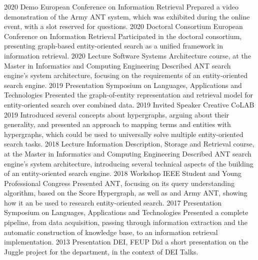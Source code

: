 \documentclass{friggeri-cv}
\begin{document}
\begin{entrylist}
\entry
{2020}
{Demo}
{European Conference on Information Retrieval}
{Prepared a video demonstration of the Army ANT system, which was exhibited during the online event, with a slot reserved for questions.}
\entry
{2020}
{Doctoral Consortium}
{European Conference on Information Retrieval}
{Participated in the doctoral consortium, presenting graph-based entity-oriented search as a unified framework in information retrieval.}
\entry
{2020}
{Lecture}
{Software Systems Architecture course, at the Master in Informatics and Computing Engineering}
{Described ANT search engine's system architecture, focusing on the requirements of an entity-oriented search engine.}
\entry
{2019}
{Presentation}
{Symposium on Languages, Applications and Technologies}
{Presented the graph-of-entity representation and retrieval model for entity-oriented search over combined data.}
\entry
{2019}
{Invited Speaker}
{Creative CoLAB 2019}
{Introduced several concepts about hypergraphs, arguing about their generality, and presented an approach to mapping terms and entities with hypergraphs, which could be used to universally solve multiple entity-oriented search tasks.}
\entry
{2018}
{Lecture}
{Information Description, Storage and Retrieval course, at the Master in Informatics and Computing Engineering}
{Described ANT search engine's system architecture, introducing several technical aspects of the building of an entity-oriented search engine.}
\entry
{2018}
{Workshop}
{IEEE Student and Young Professional Congress}
{Presented ANT, focusing on its query understanding algorithm, based on the Score Hypergraph, as well as and Army ANT, showing how it an be used to research entity-oriented search.}
\entry
{2017}
{Presentation}
{Symposium on Languages, Applications and Technologies}
{Presented a complete pipeline, from data acquisition, passing through information extraction and the automatic construction of knowledge base, to an information retrieval implementation.}
\entry
{2013}
{Presentation}
{DEI, FEUP}
{Did a short presentation on the Juggle project for the department, in the context of DEI Talks.}
\end{entrylist}
\end{document}
